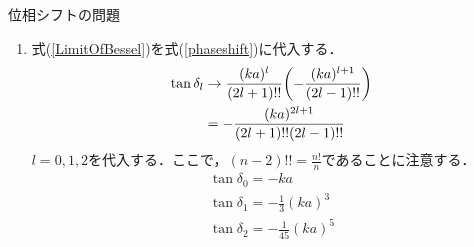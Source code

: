 \documentclass{report}
\begin{document}
\begin{myex}{位相シフトの問題}{}
\begin{enumerate}
            \begin{align}
              \e^{2\i \delta_l} h_l^{(1)} (ka) + h_l^{(2)}(ka) = 0\\
              \e^{2\i \delta_l}\qty(j_l(ka) + \i n_l(ka)) + \qty(j_l(ka) - \i n_l(ka)) = 0\\
              \qty(\e^{2\i \delta_l} + 1)j_l(ka) + \i\qty(\e^{2\i \delta_l} - 1)n_l(ka) = 0\\
              2\cos\delta_l j_l(ka) -2 \sin\delta_l n_l(ka) = 0
            \end{align}
            となり，位相シフト
            \begin{align}
              \label{phaseshift}
              \tan\delta_l = \frac{j_l(ka)}{n_l(ka)}
            \end{align}
            が得られる．
      \item 式(\ref{LimitOfBessel})を式(\ref{phaseshift})に代入する．
            \begin{align}
              \tan\delta_l &\to \frac{(ka)^l}{(2l+1)!!} \qty(- \frac{(ka)^{l+1}}{(2l -1)!!})\\
              &= -\frac{(ka)^{2l+1}}{(2l+1)!!(2l-1)!!}\\
            \end{align}
            $l=0,1,2$を代入する．ここで，$(n-2)!!=\frac{n!}{n}$であることに注意する．
            \begin{align}
              \tan\delta_0 = -ka\\
              \tan\delta_1 = -\frac{1}{3}(ka)^3\\
              \tan\delta_2 = -\frac{1}{45}(ka)^5
            \end{align}
    \end{enumerate}
  \end{myex}
\end{document}

